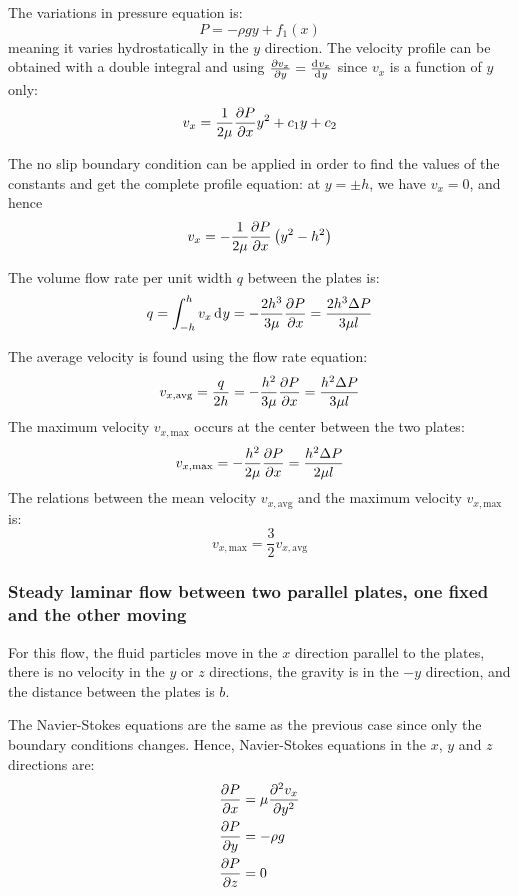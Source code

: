 \documentclass[10pt, twocolumn]{article}
\begin{document}
The variations in pressure equation is:
\[
  P = -\rho g y + f_1(x)
\]
meaning it varies hydrostatically in the \(y\) direction.
The velocity profile can be obtained with a double integral and using \(\frac{\partial v_x}{\partial y} = \frac{\mathrm{d}^{} v_x}{\mathrm{d}^{} y}\) since \(v_x\) is a function of \(y\) only:
\[
  v_x = \frac{1}{2\mu} \frac{\partial P}{\partial x} y^2 + c_1 y + c_2
\]

The no slip boundary condition can be applied in order to find the values of the constants and get the complete profile equation: at \(y = \pm h\), we have \(v_x = 0\), and hence
\[
  v_x = - \frac{1}{2\mu} \frac{\partial P}{\partial x} \left( y^2 - h^2 \right)
\]

The volume flow rate per unit width \(q\) between the plates is:
\begin{align*}
  q = \int_{-h}^h{v_x \,\mathrm{d}^{} y} = -\frac{2h^3}{3 \mu} \frac{\partial P}{\partial x} = \frac{2 h^3 \Delta P}{3 \mu l}
\end{align*}

The average velocity is found using the flow rate equation:
\[
  v_{x,\mathrm{avg}} = \frac{q}{2h} = -\frac{h^2}{3 \mu} \frac{\partial P}{\partial x} = \frac{h^2 \Delta P}{3 \mu l}
\]
The maximum velocity \(v_{x,\mathrm{max}}\) occurs at the center between the two plates:
\[
  v_{x,\mathrm{max}} = -\frac{h^2}{2\mu} \frac{\partial P}{\partial x} = \frac{h^2 \Delta P}{2\mu l}
\]
The relations between the mean velocity \(v_{x,\mathrm{avg}}\) and the maximum velocity \(v_{x,\mathrm{max}}\) is:
\[
  v_{x,\mathrm{max}} = \frac{3}{2} v_{x,\mathrm{avg}}
\]


\subsubsection{Steady laminar flow between two parallel plates, one fixed and the other moving}
For this flow, the fluid particles move in the \(x\) direction parallel to the plates, there is no velocity in the \(y\) or \(z\) directions, the gravity is in the \(-y\) direction, and the distance between the plates is \(b\).

The Navier-Stokes equations are the same as the previous case since only the boundary conditions changes.
Hence, Navier-Stokes equations in the \(x\), \(y\) and \(z\) directions are:
\begin{align*}
  \frac{\partial P}{\partial x} & = \mu \frac{\partial^{2} v_x}{\partial y^{2}} \\
  \frac{\partial P}{\partial y} & = -\rho g                            \\
  \frac{\partial P}{\partial z} & = 0
\end{align*}
\end{document}
